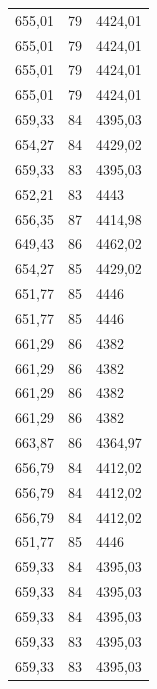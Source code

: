 \begin{center}
\begin{longtable}{|l|l|l|}
655,01            & 79               & 4424,01        \\
655,01            & 79               & 4424,01        \\
655,01            & 79               & 4424,01        \\
655,01            & 79               & 4424,01        \\
659,33            & 84               & 4395,03        \\
654,27            & 84               & 4429,02        \\
659,33            & 83               & 4395,03        \\
652,21            & 83               & 4443           \\
656,35            & 87               & 4414,98        \\
649,43            & 86               & 4462,02        \\
654,27            & 85               & 4429,02        \\
651,77            & 85               & 4446           \\
651,77            & 85               & 4446           \\
661,29            & 86               & 4382           \\
661,29            & 86               & 4382           \\
661,29            & 86               & 4382           \\
661,29            & 86               & 4382           \\
663,87            & 86               & 4364,97        \\
656,79            & 84               & 4412,02        \\
656,79            & 84               & 4412,02        \\
656,79            & 84               & 4412,02        \\
651,77            & 85               & 4446           \\
659,33            & 84               & 4395,03        \\
659,33            & 84               & 4395,03        \\
659,33            & 84               & 4395,03        \\
659,33            & 83               & 4395,03        \\
659,33            & 83               & 4395,03        \\

\end{longtable}
\end{center}

